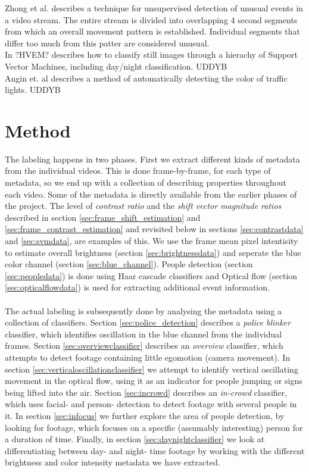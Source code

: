 Zhong et al. \cite{10.1109/CVPR.2004.78} describes a technique for unsupervised detection of unusual events in a video stream. The entire stream is divided into overlapping 4 second segments from which an overall movement pattern is established. Individual segments that differ too much from this patter are considered unusual.\\
In \cite{mangler} ?HVEM? describes how to classify still images through a hierachy of Support Vector Machines, including day/night classification. UDDYB\\
Angin et. al \cite{10.1109/MDM.2010.71} describes a method of automatically detecting the color of traffic lights. UDDYB %
%
\section{Method}
%
The labeling happens in two phases. First we extract different kinds of metadata from the individual videos. This is done frame-by-frame, for each type of metadata, so we end up with a collection of describing properties throughout each video. Some of the metadata is directly available from the earlier phases of the project. The level of \textit{contrast ratio} and the \textit{shift vector magnitude ratios} described in section \ref{sec:frame_shift_estimation} and \ref{sec:frame_contrast_estimation} and revisited below in sections \ref{sec:contrastdata} and \ref{sec:svmdata}, are examples of this. We use the frame mean pixel intentisity to estimate overall brightness (section \ref{sec:brightnessdata}) and seperate the blue color channel (section \ref{sec:blue_channel}). People detection (section \ref{sec:peopledata}) is done using Haar cascade classifiers and Optical flow (section \ref{sec:opticalflowdata}) is used for extracting additional event information.\\
\\
The actual labeling is subsequently done by analysing the metadata using a collection of classifiers. Section \ref{sec:police_detection} describes a \textit{police blinker} classifier, which identifies oscillation in the blue channel from the individual frames. Section \ref{sec:overviewclassifier} describes an \textit{overview} classifier, which attempts to detect footage containing little egomotion (camera movement). In section \ref{sec:verticaloscillationclassifier} we attempt to identify vertical oscillating movement in the optical flow, using it as an indicator for people jumping or signs being lifted into the air. Section \ref{sec:incrowd} describes an \textit{in-crowd} classifier, which uses facial- and person- detection to detect footage with several people in it. In section \ref{sec:infocus} we further explore the area of people detection, by looking for footage, which focuses on a specific (assumably interesting) person for a duration of time. Finally, in section \ref{sec:daynightclassifier} we look at differentiating between day- and night- time footage by working with the different brightness and color intensity metadata we have extracted.
%
